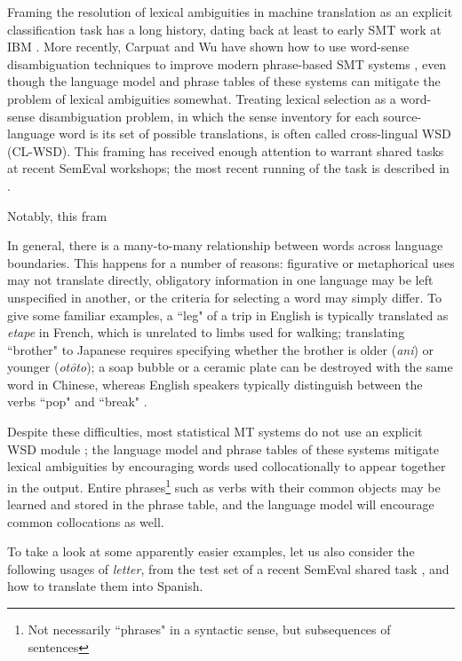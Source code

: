 Framing the resolution of lexical ambiguities in machine translation
as an explicit classification
task has a long history, dating back at least to early SMT work at IBM
\cite{Brown91word-sensedisambiguation}.  More recently, Carpuat and Wu have
shown how to use word-sense disambiguation techniques to improve modern
phrase-based SMT systems \cite{carpuatpsd}, even though the language model and
phrase tables of these systems can mitigate the problem of lexical ambiguities
somewhat. Treating lexical selection as a word-sense disambiguation problem, in
which the sense inventory for each source-language word is its set of possible
translations, is often called cross-lingual WSD (CL-WSD). This framing has
received enough attention to warrant shared tasks at recent SemEval workshops;
the most recent running of the task is described in \cite{task10}.


Notably, this fram





In general, there is a many-to-many relationship between words across language
boundaries.
This happens for a number of reasons: figurative or metaphorical uses may not
translate directly,
obligatory information in one language may be left unspecified in another,
or the criteria for selecting a word may simply differ.
To give some familiar examples, a ``leg" of a trip in English is typically
translated as \emph{etape} in French, which is unrelated to limbs used for
walking;
translating ``brother" to Japanese requires specifying whether the brother is
older (\emph{ani}) or younger (\emph{ot\=oto});
a soap bubble or a ceramic plate can be destroyed with the same word in
Chinese, whereas English speakers typically distinguish between the verbs
``pop" and ``break" \cite{majid2007semantic}.

Despite these difficulties, most statistical MT systems do not use an explicit
WSD module \cite{wsdchap3}; the language model and phrase tables of these
systems mitigate lexical ambiguities by encouraging words used collocationally
to appear together in the output. Entire phrases\footnote{Not necessarily
``phrases" in a syntactic sense, but subsequences of sentences} such as verbs
with their common objects may be learned and stored in the phrase table, and
the language model will encourage common collocations as well.

To take a look at some apparently easier examples, let us also consider the
following usages of \emph{letter}, from the test set of a recent SemEval shared
task \cite{task10}, and how to translate them into Spanish.

